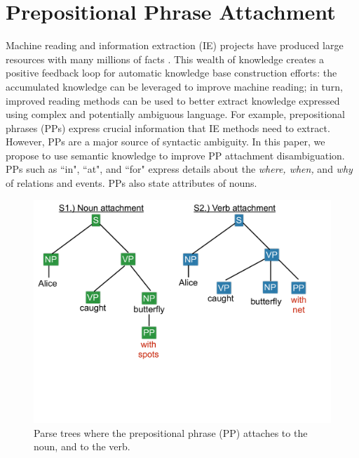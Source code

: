 \section{Prepositional Phrase Attachment}
Machine reading and information extraction (IE)  projects have produced large resources with many millions of  facts  \cite{MitchellCHTBCMG15,suchanek2007yago}.  This wealth of knowledge  creates  a positive feedback loop for automatic knowledge base construction efforts: the accumulated knowledge can be leveraged to improve   machine reading; in turn,  improved  reading methods can be used to better  extract knowledge expressed using complex and  potentially ambiguous language.
 For example,  prepositional phrases (PPs)   express crucial information that  IE methods need to extract.
 However, PPs are a major source of  syntactic  ambiguity. In this paper, we propose to use semantic knowledge to  improve PP attachment disambiguation. 
 PPs such as  ``in", ``at", and ``for" express details about the  \textit{where, when,} and \textit{why}  of  relations and events. PPs   also state  attributes of nouns. 
 
     
         \begin{figure}[t]
         \centering
         \includegraphics[width=1\columnwidth] {trees2.pdf}
         \vspace*{-2.6cm}
         \caption{Parse trees where the prepositional phrase (PP) attaches to the noun, and to the verb.}
         \label{fig:deptrees}
         \end{figure}

